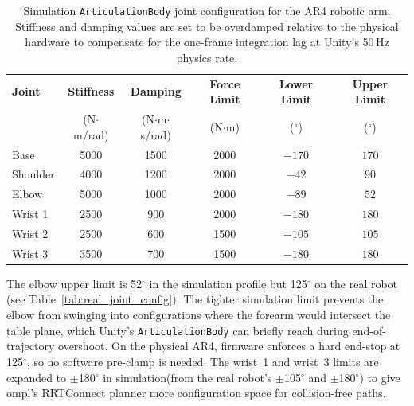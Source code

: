 \documentclass[
     12pt,
     a4paper,
     BCOR=10mm,
     DIV=14,
     listof=totoc,
     bibliography=totoc,
     parskip,
     twoside,
     headsepline
     ]{scrreprt}
\begin{document}
\begin{table}[ht]
	\centering
	\begin{tabular}{lccccc}
		\hline
		\textbf{Joint}       & \textbf{Stiffness}   & \textbf{Damping}        &
		\textbf{Force Limit} & \textbf{Lower Limit} & \textbf{Upper Limit}                                            \\
		                     & (N$\cdot$m/rad)      & (N$\cdot$m$\cdot$s/rad) & (N$\cdot$m) & ($^\circ$) & ($^\circ$) \\
		\hline
		Base                 & 5000                 & 1500                    & 2000        & $-170$     & $170$      \\
		Shoulder             & 4000                 & 1200                    & 2000        & $-42$      & $90$       \\
		Elbow                & 5000                 & 1000                    & 2000        & $-89$      & $52$       \\
		Wrist 1              & 2500                 & 900                     & 2000        & $-180$     & $180$      \\
		Wrist 2              & 2500                 & 600                     & 1500        & $-105$     & $105$      \\
		Wrist 3              & 3500                 & 700                     & 1500        & $-180$     & $180$      \\
		\hline
	\end{tabular}
	\caption{Simulation \texttt{ArticulationBody} joint configuration for the AR4 robotic arm. Stiffness and damping values are set to be overdamped relative to the physical hardware to compensate for the one-frame integration lag at Unity's 50\,Hz physics rate.}
	\label{tab:used_joint_config}
\end{table}

The elbow upper limit is 52$^\circ$ in the simulation profile but 125$^\circ$ on the real robot (see Table~\ref{tab:real_joint_config}). The tighter simulation limit prevents the elbow from swinging into configurations where the forearm would intersect the table plane, which Unity's \texttt{ArticulationBody} can briefly reach during end-of-trajectory overshoot. On the physical AR4, firmware enforces a hard end-stop at 125$^\circ$, so no software pre-clamp is needed. The wrist~1 and wrist~3 limits are expanded to $\pm$180$^\circ$ in simulation(from the real robot's $\pm$105$^\circ$ and $\pm$180$^\circ$) to give \gls{ompl}'s RRTConnect planner more configuration space for collision-free paths.
\end{document}
